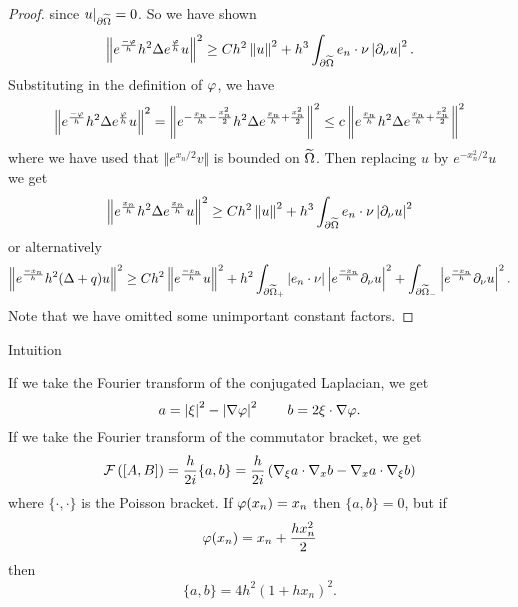 \begin{proof}
  since $u|_{\partial\widetilde\Omega} = 0$.
  So we have shown
  \[ \left\lVert  e^\frac{-\varphi}{h} h^2 \Delta e^\frac{\varphi} h u  \right\rVert^2 \geq Ch^2\left\lVert u \right\rVert^2 + h^3 \int_{\partial\widetilde\Omega} e_n \cdot \nu \left\lvert \partial_\nu u \right\rvert^2. \]
  Substituting in the definition of $\varphi$, we have
  \[ \left\lVert  e^\frac{-\varphi}{h} h^2 \Delta e^\frac{\varphi} h u  \right\rVert^2 = \left\lVert  e^{-\frac{x_n}{h}-\frac{x_n^2}{2}} h^2 \Delta e^{\frac{x_n}{h}+\frac{x_n^2}{2}}  \right\rVert^2 \leq c \left\lVert  e^{\frac{x_n}{h}} h^2 \Delta e^{\frac{x_n}{h}+\frac{x_n^2}{2}}  \right\rVert^2 \]
  where we have used that $\Vert e^{x_n/2}v \Vert$ is bounded on $\widetilde\Omega$.
  Then replacing $u$ by $e^{-x_n^2/2}u$ we get
  \[ \left\lVert  e^\frac{x_n}{h} h^2 \Delta e^\frac{x_n}h u  \right\rVert^2 \geq Ch^2\left\lVert u \right\rVert^2 + h^3 \int_{\partial\widetilde\Omega} e_n \cdot \nu \left\lvert \partial_\nu u \right\rvert^2 \]
  or alternatively
  \[ \left\lVert  e^\frac{-x_n}{h} h^2 (\Delta+q)u  \right\rVert^2 \geq Ch^2 \left\lVert e^\frac{-x_n}{h} u  \right\rVert^2 + h^2 \int_{\partial\widetilde\Omega_+} \left\lvert e_n \cdot \nu \right\rvert \left\lvert  e^\frac{-x_n}{h} \partial_\nu u  \right\rvert^2 + \int_{\partial\widetilde\Omega_-} \left\lvert  e^\frac{-x_n}{h} \partial_\nu u  \right\rvert^2. \]
  Note that we have omitted some unimportant constant factors.
\end{proof}

Intuition

If we take the Fourier transform of the conjugated Laplacian, we get
\[ a = \left\lvert \xi \right\rvert^2 - \left\lvert \nabla\varphi \right\rvert^2 \qquad b = 2\xi \cdot \nabla\varphi. \]
If we take the Fourier transform of the commutator bracket, we get
\[ \mathcal{F} \left( [A,B] \right) = \frac{h}{2i}\{a,b\} = \frac{h}{2i} \left( \nabla_\xi a \cdot \nabla_x b - \nabla_x a \cdot \nabla_\xi b \right) \]
where $\{\cdot,\cdot\}$ is the Poisson bracket.
If $\varphi(x_n)=x_n$ then $\{a,b\}=0$, but if
\[ \varphi(x_n)=x_n + \frac{hx_n^2}{2} \]
then
\[ \{a,b\} = 4h^2(1+hx_n)^2. \]

